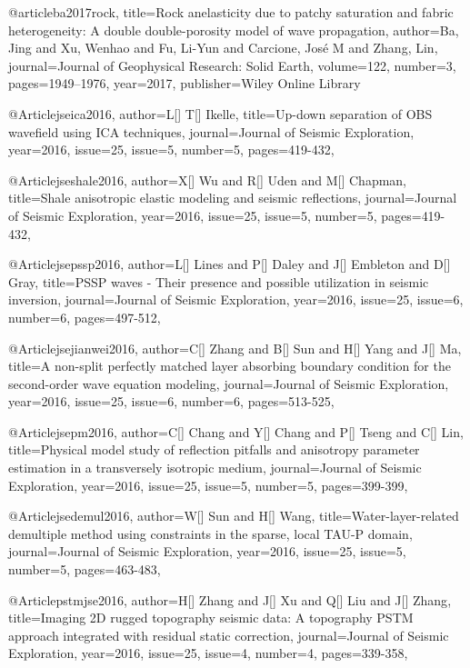@article{ba2017rock,
  title={Rock anelasticity due to patchy saturation and fabric heterogeneity: A double double-porosity model of wave propagation},
  author={Ba, Jing and Xu, Wenhao and Fu, Li-Yun and Carcione, Jos{\'e} M and Zhang, Lin},
  journal={Journal of Geophysical Research: Solid Earth},
  volume={122},
  number={3},
  pages={1949--1976},
  year={2017},
  publisher={Wiley Online Library}
}


@Article{jseica2016,
  author={L[] T[] Ikelle},
  title={Up-down separation of OBS wavefield using ICA techniques},
  journal={Journal of Seismic Exploration},
  year=2016,
  issue=25,
  issue=5,
  number=5,
  pages={419-432},
}

@Article{jseshale2016,
  author={X[] Wu and R[] Uden and M[] Chapman},
  title={Shale anisotropic elastic modeling and seismic reflections},
  journal={Journal of Seismic Exploration},
  year=2016,
  issue=25,
  issue=5,
  number=5,
  pages={419-432},
}


@Article{jsepssp2016,
  author={L[] Lines and P[] Daley and J[] Embleton and D[] Gray},
  title={PSSP waves - Their presence and possible utilization in seismic inversion},
  journal={Journal of Seismic Exploration},
  year=2016,
  issue=25,
  issue=6,
  number=6,
  pages={497-512},
}


@Article{jsejianwei2016,
  author={C[] Zhang and B[] Sun and H[] Yang and J[] Ma},
  title={A non-split perfectly matched layer absorbing boundary condition for the second-order wave equation modeling},
  journal={Journal of Seismic Exploration},
  year=2016,
  issue=25,
  issue=6,
  number=6,
  pages={513-525},
}

@Article{jsepm2016,
  author={C[] Chang and Y[] Chang and P[] Tseng and C[] Lin},
  title={Physical model study of reflection pitfalls and anisotropy parameter estimation in a transversely isotropic medium},
  journal={Journal of Seismic Exploration},
  year=2016,
  issue=25,
  issue=5,
  number=5,
  pages={399-399},
}

@Article{jsedemul2016,
  author={W[] Sun and H[] Wang},
  title={Water-layer-related demultiple method using constraints in the sparse, local TAU-P domain},
  journal={Journal of Seismic Exploration},
  year=2016,
  issue=25,
  issue=5,
  number=5,
  pages={463-483},
}

@Article{pstmjse2016,
  author={H[] Zhang and J[] Xu and Q[] Liu and J[] Zhang},
  title={Imaging 2D rugged topography seismic data: A topography PSTM approach integrated with residual static correction},
  journal={Journal of Seismic Exploration},
  year=2016,
  issue=25,
  issue=4,
  number=4,
  pages={339-358},
}


